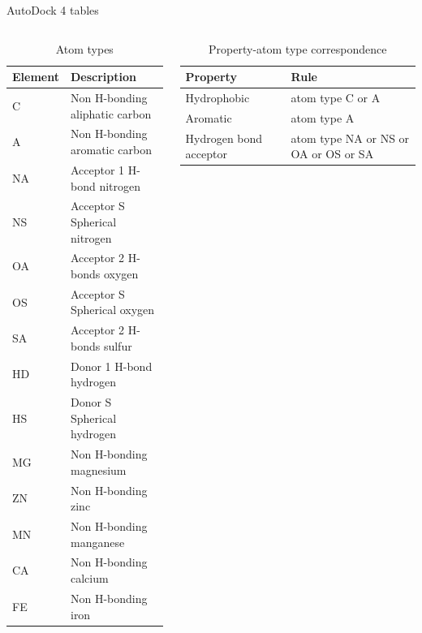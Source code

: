 \documentclass{beamer}
\begin{document}
\begin{frame}{AutoDock 4 tables}
  \begin{columns}
    \begin{column}{.4\textwidth}
      \begin{tiny}
      \begin{table}
      \caption{Atom types}
      \label{table:1}
      \begin{tabular}{ l l }
        \hline
        Element & Description \\
        \hline
        C & Non H-bonding aliphatic carbon \\
        A & Non H-bonding aromatic carbon \\
        NA & Acceptor 1 H-bond nitrogen \\
        NS & Acceptor S Spherical nitrogen \\
        OA & Acceptor 2 H-bonds oxygen \\
        OS & Acceptor S Spherical oxygen \\
        SA & Acceptor 2 H-bonds sulfur \\
        HD & Donor 1 H-bond hydrogen \\
        HS & Donor S Spherical hydrogen \\
        MG & Non H-bonding magnesium \\
        ZN & Non H-bonding zinc \\
        MN & Non H-bonding manganese \\
        CA & Non H-bonding calcium \\
        FE & Non H-bonding iron \\
        \hline
      \end{tabular}
      \end{table}
      \end{tiny}
    \end{column}
    \begin{column}{.6\textwidth}
      \begin{tiny}
      \begin{table}
      \caption{Property-atom type correspondence}
      \label{table:2}
      \begin{tabular}{ l l }
        \hline
        Property & Rule \\
        \hline
        Hydrophobic & atom type C or A \\
        Aromatic & atom type A \\
        Hydrogen bond acceptor & atom type NA or NS or OA or OS or SA \\

\end{tabular}
\end{table}
\end{tiny}
\end{column}
\end{columns}
\end{frame}
\end{document}
